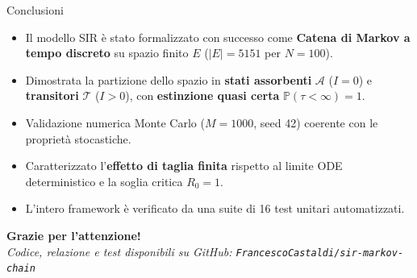 \documentclass[10pt, aspectratio=169]{beamer}
\begin{document}
\begin{frame}{Conclusioni}
    \begin{itemize}
        \item Il modello SIR è stato formalizzato con successo come \textbf{Catena di Markov a tempo discreto} su spazio finito $E$ ($|E| = 5151$ per $N=100$).
        \item Dimostrata la partizione dello spazio in \textbf{stati assorbenti} $\mathcal{A}$ ($I=0$) e \textbf{transitori} $\mathcal{T}$ ($I>0$), con \textbf{estinzione quasi certa} $\mathbb{P}(\tau < \infty) = 1$.
        \item Validazione numerica Monte Carlo ($M=1000$, seed 42) coerente con le proprietà stocastiche.
        \item Caratterizzato l'\textbf{effetto di taglia finita} rispetto al limite ODE deterministico e la soglia critica $R_0 = 1$.
        \item L'intero framework è verificato da una suite di 16 test unitari automatizzati.
    \end{itemize}
    
    \vspace{0.6cm}
    \begin{center}
        {\Large \textbf{Grazie per l'attenzione!}}\\[0.2cm]
        \textit{Codice, relazione e test disponibili su GitHub: \texttt{FrancescoCastaldi/sir-markov-chain}}
    \end{center}

\end{frame}
\end{document}
